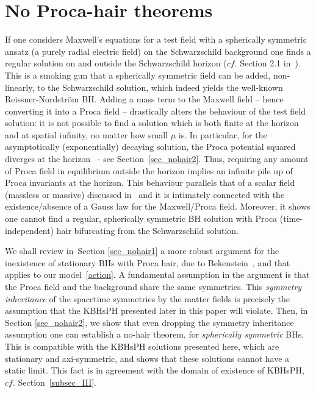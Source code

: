 \section{No Proca-hair theorems}
\label{sec_nohair}
If one considers Maxwell's equations for a test field with a spherically symmetric ansatz (a purely radial electric field) on the Schwarzschild background one finds a regular solution on and outside the Schwarzschild horizon ($cf.$ Section 2.1 in~\cite{Herdeiro:2015waa}). This is a smoking gun that a spherically symmetric field can be added, non-linearly, to the Schwarzschild solution, which indeed yields the well-known Reissner-Nordstr\"om BH. 
Adding a mass term to the Maxwell field -- hence converting it into a Proca field -- drastically alters the behaviour of the test field solution: it is not possible to find a solution which is both finite at the horizon and at spatial infinity, no matter how small $\mu$ is. 
In particular, for the asymptotically (exponentially) decaying solution, the Proca potential squared diverges at the horizon~\cite{Gottlieb:1984jg} - see Section~\ref{sec_nohair2}. Thus, requiring any amount of Proca field in equilibrium outside the horizon implies an infinite pile up of Proca invariants at the horizon. This behaviour parallels that of a scalar field (massless or massive) discussed in~\cite{Herdeiro:2015waa} and it is intimately connected with the existence/absence of a Gauss law for the Maxwell/Proca field. Moreover, it shows one cannot find a regular, spherically symmetric BH solution with Proca (time-independent) hair bifurcating from the Schwarzschild solution.

We shall review in~Section \ref{sec_nohair1} a more robust argument for the inexistence of stationary BHs with Proca hair, due to Bekenstein~\cite{Bekenstein:1971hc,Bekenstein:1972ky}, and that applies to our model~\eqref{action}. A fundamental assumption in the argument is that the Proca field and the background share the same symmetries. This \textit{symmetry inheritance} of the spacetime symmetries by the matter fields is precisely the assumption that  the KBHsPH presented later in this paper will violate. Then, in Section \ref{sec_nohair2}, we show that even dropping the symmetry inheritance assumption one can establish a no-hair theorem, for \textit{spherically symmetric} BHs. This is compatible with the KBHsPH solutions presented here, which are stationary and axi-symmetric, and shows that these solutions cannot have a static limit. This fact is in agreement with the domain of existence of KBHsPH, $cf.$ Section~\ref{subsec_III}.



